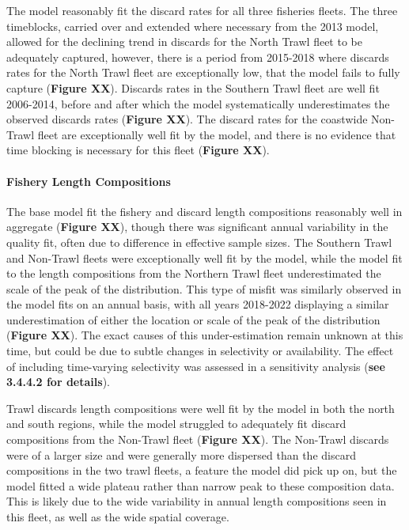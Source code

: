 \documentclass[11pt,
  english,
  letterpaper,
]{article}
\begin{document}
The model reasonably fit the discard rates for all three fisheries fleets. The three timeblocks, carried over and extended where necessary from the 2013 model, allowed for the declining trend in discards for the North Trawl fleet to be adequately captured, however, there is a period from 2015-2018 where discards rates for the North Trawl fleet are exceptionally low, that the model fails to fully capture (\textbf{Figure XX}). Discards rates in the Southern Trawl fleet are well fit 2006-2014, before and after which the model systematically underestimates the observed discards rates (\textbf{Figure XX}). The discard rates for the coastwide Non-Trawl fleet are exceptionally well fit by the model, and there is no evidence that time blocking is necessary for this fleet (\textbf{Figure XX}).

\hypertarget{fishery-length-compositions-1}{%
\paragraph{Fishery Length Compositions}\label{fishery-length-compositions-1}}

The base model fit the fishery and discard length compositions reasonably well in aggregate (\textbf{Figure XX}), though there was significant annual variability in the quality fit, often due to difference in effective sample sizes. The Southern Trawl and Non-Trawl fleets were exceptionally well fit by the model, while the model fit to the length compositions from the Northern Trawl fleet underestimated the scale of the peak of the distribution. This type of misfit was similarly observed in the model fits on an annual basis, with all years 2018-2022 displaying a similar underestimation of either the location or scale of the peak of the distribution (\textbf{Figure XX}). The exact causes of this under-estimation remain unknown at this time, but could be due to subtle changes in selectivity or availability. The effect of including time-varying selectivity was assessed in a sensitivity analysis (\textbf{see 3.4.4.2 for details}).

Trawl discards length compositions were well fit by the model in both the north and south regions, while the model struggled to adequately fit discard compositions from the Non-Trawl fleet (\textbf{Figure XX}). The Non-Trawl discards were of a larger size and were generally more dispersed than the discard compositions in the two trawl fleets, a feature the model did pick up on, but the model fitted a wide plateau rather than narrow peak to these composition data. This is likely due to the wide variability in annual length compositions seen in this fleet, as well as the wide spatial coverage.
\end{document}
